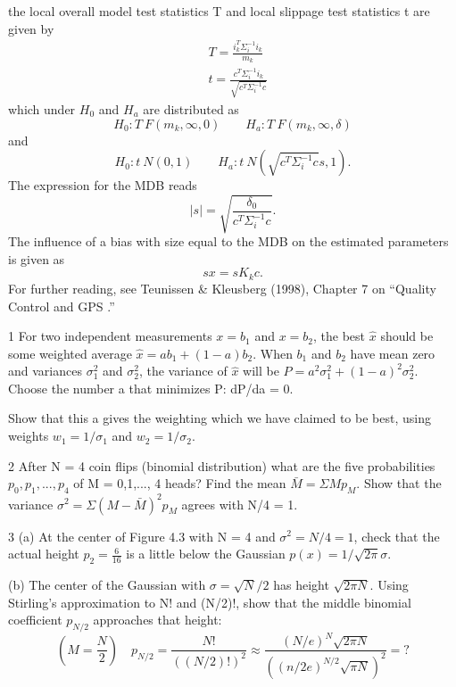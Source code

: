 	the local overall model test statistics T and local slippage test statistics t are given by
	\begin{equation*}
	\begin{split}
	&T=\frac{i^T_k\Sigma^{-1}_ii_k}{m_k}\\
	&t=\frac{c^T\Sigma^{-1}_ii_k}{\sqrt{c^T\Sigma^{-1}_ic}}
	\end{split}
	\end{equation*}
	which under $H_0$ and $H_a$ are distributed as
	\begin{equation*}
	H_0:T~F(m_k,\infty ,0) \qquad H_a:T~F(m_k,\infty ,\delta)
	\end{equation*}	
	and
	\begin{equation*}
	H_0:t~N(0,1) \qquad H_a:t~N(\sqrt{c^T\Sigma^{-1}_ic}s,1).
	\end{equation*}
	The expression for the MDB reads
	\begin{equation*}
	|s|=\sqrt{\frac{\delta_0}{c^T\Sigma^{-1}_ic}}.
	\end{equation*}
	The influence of a bias with size equal to the MDB on the estimated parameters is given as
	\begin{equation*}
	sx=sK_kc.
	\end{equation*}
	For further reading, see Teunissen \& Kleusberg (1998), Chapter 7 on “Quality Control and GPS .”
	

1\; For two independent measurements $x= b_1$ and $x= b_2$, the best $\hat{x}$ should be some
weighted average $\hat{x}=ab_1+(1-a)b_2$. When $b_1$ and $b_2$ have mean zero and
variances $\sigma^2_1$ and $\sigma^2_2$, the variance of $\hat{x}$ will be $P=a^2\sigma^2_1+(1-a)^2\sigma^2_2$. Choose the number a that minimizes P: dP/da = 0.

Show that this a gives the weighting which we have claimed to be best, using weights
$w_1=1/\sigma_1$ and $w_2=1/\sigma_2$.

2\; After N = 4 coin flips (binomial distribution) what are the five probabilities $p_0,p_1,...,p_4$ of M = 0,1,..., 4 heads? Find the mean $\bar{M}=\Sigma Mp_M$.
Show that the variance $\sigma^2=\Sigma(M-\bar{M})^2 p_M$ agrees with N/4 = 1.

3\; (a) At the center of Figure 4.3 with N = 4 and $\sigma^2=N/4 = 1$, check that the actual
height $p_2=\frac{6}{16}$ is a little below the Gaussian $p(x)=1/\sqrt{2\pi}\sigma$.

(b) The center of the Gaussian with $\sigma=\sqrt{N}/2$ has height $\sqrt{2\pi N}$. Using Stirling's approximation to N! and (N/2)!, show that the middle binomial coefficient $p_{N/2}$
approaches that height: 	
\begin{equation*}
(M=\frac{N}{2})   \quad p_{N/2}=\frac{N!}{((N/2)!)^2}\approx \frac{(N/e)^N\sqrt{2\pi N}}{((n/2e)^{N/2}\sqrt{\pi N})^2}=?
\end{equation*}	

